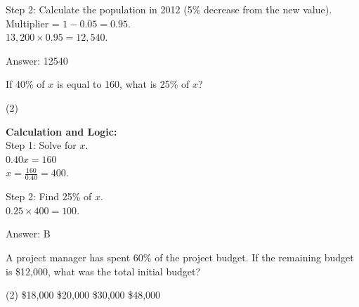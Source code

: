 \documentclass[11pt,paper=a4,answers]{exam}
\begin{document}
\begin{questions}
\begin{solution}
\vspace{15pt}

Step 2: Calculate the population in 2012 (5\% decrease from the new value). \\
Multiplier = $1 - 0.05 = 0.95$. \\
$13,200 \times 0.95 = 12,540$.

\vspace{30pt}

Answer: \colorbox{yellow!100}{12540}
\end{solution}

\vspace{60pt}

\question
If 40\% of $x$ is equal to 160, what is 25\% of $x$?
\begin{tasks}(2)
\end{tasks}

\begin{solution}
\textbf{Calculation and Logic:} \\
Step 1: Solve for $x$. \\
$0.40x = 160$ \\
$x = \frac{160}{0.40} = 400$.

\vspace{15pt}

Step 2: Find 25\% of $x$. \\
$0.25 \times 400 = 100$.

\vspace{30pt}

Answer: \colorbox{yellow!100}{B}
\end{solution}

\vspace{60pt}

\question
\begin{center}
\end{center}
A project manager has spent 60\% of the project budget. If the remaining budget is \$12,000, what was the total initial budget?
\begin{tasks}(2)
    \task \$18,000
    \task \$20,000
    \task \$30,000
    \task \$48,000
\end{tasks}


\end{questions}
\end{document}
